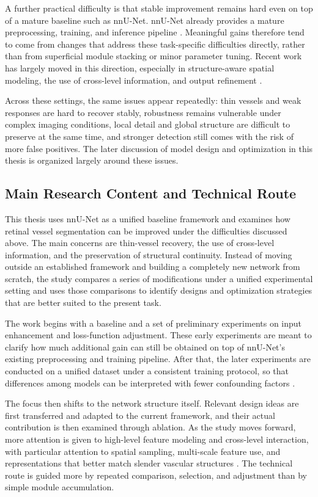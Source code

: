 \documentclass[a4paper,11pt]{article}
\begin{document}
A further practical difficulty is that stable improvement remains hard even on top of a mature baseline such as nnU-Net. nnU-Net already provides a mature preprocessing, training, and inference pipeline \cite{isensee2021nnunet}. Meaningful gains therefore tend to come from changes that address these task-specific difficulties directly, rather than from superficial module stacking or minor parameter tuning. Recent work has largely moved in this direction, especially in structure-aware spatial modeling, the use of cross-level information, and output refinement \cite{luo2025panet,qi2023dsc,hou2021coordatt}.

Across these settings, the same issues appear repeatedly: thin vessels and weak responses are hard to recover stably, robustness remains vulnerable under complex imaging conditions, local detail and global structure are difficult to preserve at the same time, and stronger detection still comes with the risk of more false positives. The later discussion of model design and optimization in this thesis is organized largely around these issues.

\subsection{Main Research Content and Technical Route}
This thesis uses nnU-Net as a unified baseline framework and examines how retinal vessel segmentation can be improved under the difficulties discussed above. The main concerns are thin-vessel recovery, the use of cross-level information, and the preservation of structural continuity. Instead of moving outside an established framework and building a completely new network from scratch, the study compares a series of modifications under a unified experimental setting and uses those comparisons to identify designs and optimization strategies that are better suited to the present task.

The work begins with a baseline and a set of preliminary experiments on input enhancement and loss-function adjustment. These early experiments are meant to clarify how much additional gain can still be obtained on top of nnU-Net's existing preprocessing and training pipeline. After that, the later experiments are conducted on a unified dataset under a consistent training protocol, so that differences among models can be interpreted with fewer confounding factors \cite{isensee2021nnunet}.

The focus then shifts to the network structure itself. Relevant design ideas are first transferred and adapted to the current framework, and their actual contribution is then examined through ablation. As the study moves forward, more attention is given to high-level feature modeling and cross-level interaction, with particular attention to spatial sampling, multi-scale feature use, and representations that better match slender vascular structures \cite{luo2025panet,zhu2019dcnv2,qi2023dsc}. The technical route is guided more by repeated comparison, selection, and adjustment than by simple module accumulation.
\end{document}
